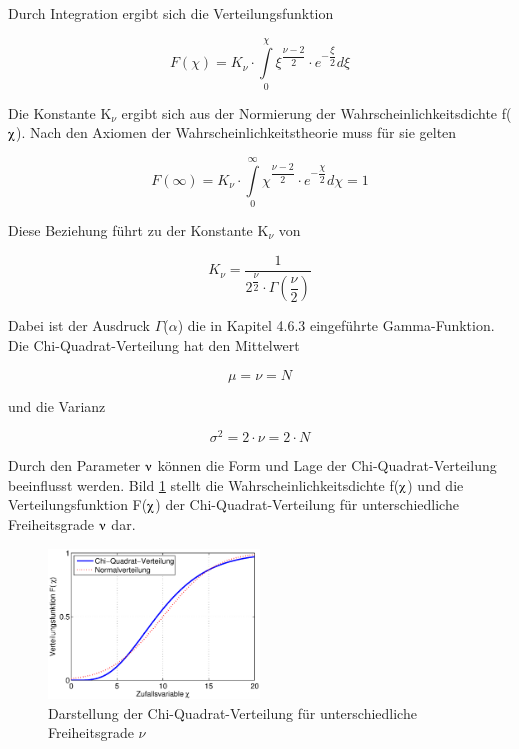 \noindent Durch Integration ergibt sich die Verteilungsfunktion

\begin{equation}\label{eq:fourtwohundredthirtyone}
F\left(\chi \right)=K_{\nu} \cdot \int\limits _{0}^{\chi}\xi ^{\dfrac{\nu -2}{2}} \cdot e^{-\dfrac{\xi}{2}}  d\xi
\end{equation}

\noindent Die Konstante K$_{\nu}$ ergibt sich aus der Normierung der Wahrscheinlichkeitsdichte f($\chiup$). Nach den Axiomen der Wahrscheinlichkeitstheorie muss f\"{u}r sie gelten

\begin{equation}\label{eq:fourtwohundredthirtytwo}
F\left(\infty \right)=K_{\nu} \cdot \int\limits _{0}^{\infty }\chi ^{\dfrac{\nu -2}{2}} \cdot e^{-\dfrac{\chi}{2}}  d\chi =1
\end{equation}

\noindent Diese Beziehung f\"{u}hrt zu der Konstante K$_{\nu}$ von 

\begin{equation}\label{eq:fourtwohundredthirtythree}
K_{\nu } =\dfrac{1}{2^{\dfrac{\nu }{2}} \cdot \Gamma \left(\dfrac{\nu}{2} \right)}
\end{equation}

\noindent Dabei ist der Ausdruck $\Gamma$($\alpha$) die in Kapitel 4.6.3 eingef\"{u}hrte Gamma-Funktion. Die Chi-Quadrat-Verteilung hat den Mittelwert

\begin{equation}\label{eq:fourtwohundredthirtyfour}
\mu =\nu =N
\end{equation}

\noindent und die Varianz 

\begin{equation}\label{eq:fourtwohundredthirtyfive}
\sigma ^{2} =2\cdot \nu =2\cdot N
\end{equation}

\noindent Durch den Parameter $\nuup$ k\"{o}nnen die Form und Lage der Chi-Quadrat-Verteilung beeinflusst werden. Bild \ref{fig:Testverteilungen_ChiQuadrat1} stellt die Wahrscheinlichkeitsdichte f($\chiup$) und die Verteilungsfunktion F($\chiup$) der Chi-Quadrat-Verteilung f\"{u}r unterschiedliche Freiheitsgrade $\nuup$ dar.

\begin{figure}[H]
  \centerline{\includegraphics[width=0.5\textwidth]{Kapitel4/Bilder/image43}}
  \caption{Darstellung der Chi-Quadrat-Verteilung f\"{u}r unterschiedliche Freiheitsgrade $\nu$}
  \label{fig:Testverteilungen_ChiQuadrat1}
\end{figure}

